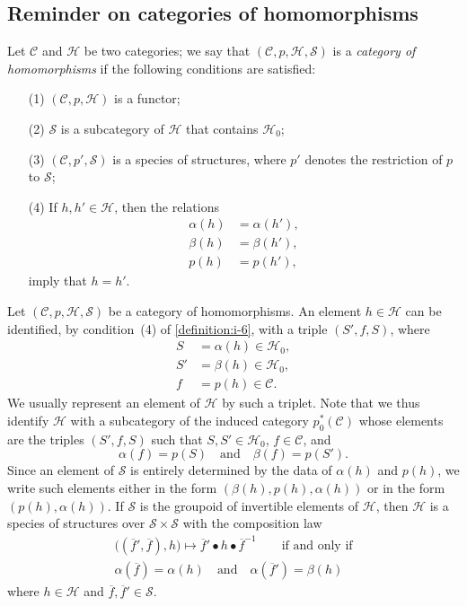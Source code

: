 \documentclass[a4paper,fleqn]{article}
\theoremstyle{plain}
\theoremstyle{definition}
\newenvironment{definition}[1]
  {\renewcommand\theinnerdefinition{#1}\innerdefinition}
  {\endinnerdefinition}
\newcommand{\oldpage}[1]{{\marginpar{\footnotesize$\bigg\vert$\,\,\,\,\textit{p.~#1}}}}
\newcommand{\textand}{\quad\text{and}\quad}
\newcommand{\CC}{\mathcal{C}}
\newcommand{\HH}{\mathcal{H}}
\renewcommand{\SS}{\mathcal{S}}
\begin{document}
\subsection{Reminder on categories of homomorphisms}
\label{section:i.4}

\begin{definition}{6}
\label{definition:i-6}
  Let $\CC$ and $\HH$ be two categories;
  we say \cite{3a} that $(\CC,p,\HH,\SS)$ is a \emph{category of homomorphisms} if the following conditions are satisfied:
  \begin{enumerate}
    \item[\normalfont(1)]
      $(\CC,p,\HH)$ is a functor;
    \item[\normalfont(2)]
      \oldpage{357}
      $\SS$ is a subcategory of $\HH$ that contains $\HH_0$;
    \item[\normalfont(3)]
      $(\CC,p',\SS)$ is a species of structures, where $p'$ denotes the restriction of $p$ to $\SS$;
    \item[\normalfont(4)]
      If $h,h'\in\HH$, then the relations
      \[
        \begin{aligned}
          \alpha(h)
          &= \alpha(h'),
        \\\beta(h)
          &= \beta(h'),
        \\p(h)
          &= p(h'),
        \end{aligned}
      \]
      imply that $h=h'$.
  \end{enumerate}
\end{definition}

Let $(\CC,p,\HH,\SS)$ be a category of homomorphisms.
An element $h\in\HH$ can be identified, by condition~(4) of \cref{definition:i-6}, with a triple $(S',f,S)$, where
\[
  \begin{aligned}
    S
    &= \alpha(h) \in\HH_0,
  \\S'
    &= \beta(h) \in\HH_0,
  \\f
    &= p(h)\in\CC.
  \end{aligned}
\]
We usually represent an element of $\HH$ by such a triplet.
Note that we thus identify $\HH$ with a subcategory of the induced category $p_0^*(\CC)$ whose elements are the triples $(S',f,S)$ such that $S,S'\in\HH_0$, $f\in\CC$, and
\[
  \alpha(f)=p(S)
  \textand
  \beta(f)=p(S').
\]
Since an element of $\SS$ is entirely determined by the data of $\alpha(h)$ and $p(h)$, we write such elements either in the form $(\beta(h),p(h),\alpha(h))$ or in the form $(p(h),\alpha(h))$.
If $\SS$ is the groupoid of invertible elements of $\HH$, then $\HH$ is a species of structures over $\SS\times\SS$ with the composition law
\[
  \begin{gathered}
    \big((\overline{f}',\overline{f}),h\big)
    \longmapsto\overline{f}'\bullet h\bullet\overline{f}^{-1}
    \qquad\text{if and only if}
  \\\alpha(\overline{f})=\alpha(h)
    \textand
    \alpha(\overline{f}')=\beta(h)
  \end{gathered}
\]
where $h\in\HH$ and $\overline{f},\overline{f}'\in\SS$.
\end{document}
